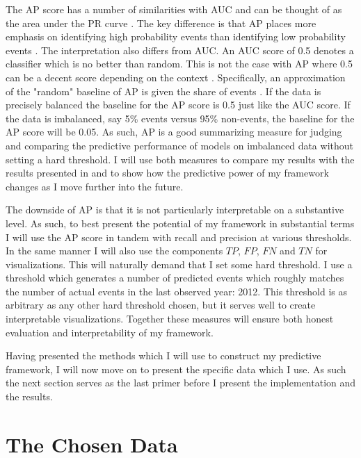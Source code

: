 \documentclass[a4paper]{article}
\begin{document}
The AP score has a number of similarities with AUC and can be thought of as the area under the PR curve  \citep[349-350]{su2015relationship}. The key difference is that AP places more emphasis on identifying high probability events than identifying low probability events \citep[350]{su2015relationship}. The interpretation also differs from AUC. An AUC score of 0.5 denotes a classifier which is no better than random. This is not the case with AP where 0.5 can be a decent score depending on the context \citep[350-351]{su2015relationship}. Specifically, an approximation of the "random" baseline of AP is given the share of events \citep[132]{bestgen2015AP}. If the data is precisely balanced the baseline for the AP score is 0.5 just like the AUC score. If the data is imbalanced, say 5\% events versus 95\% non-events, the baseline for the AP score will be 0.05. As such, AP is a good summarizing measure for judging and comparing the predictive performance of models on imbalanced data without setting a hard threshold. I will use both measures to compare my results with the results presented in \cite{Maase} and to show how the predictive power of my framework changes as I move further into the future.\par

The downside of AP is that it is not particularly interpretable on a substantive level. As such, to best present the potential of my framework in substantial terms I will use the AP score in tandem with recall and precision at various thresholds. In the same manner I will also use the components $TP$, $FP$, $FN$ and $TN$ for visualizations. This will naturally demand that I set some hard threshold. I use a threshold which generates a number of predicted events which roughly matches the number of actual events in the last observed year: 2012. This threshold is as arbitrary as any other hard threshold chosen, but it serves well to create interpretable visualizations. Together these measures will ensure both honest evaluation and interpretability of my framework.\par %

Having presented the methods which I will use to construct my predictive framework, I will now move on to present the specific data which I use. As such the next section serves as the last primer before I present the implementation and the results.\par

\section{The Chosen Data}\label{data}%
\end{document}
